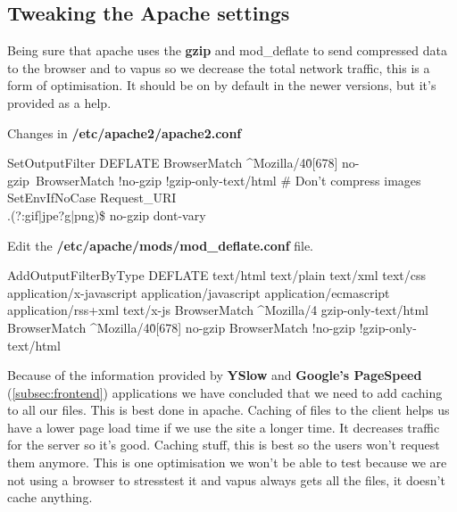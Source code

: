 \clearpage{}
\subsection{Tweaking the Apache settings}
Being sure that \gls{apache} uses the \textbf{gzip} and mod\_deflate to send compressed data to the browser and to \gls{vapus} so we decrease the total network traffic, this is a form of optimisation. It should be on by default in the newer versions, but it's provided as a help.

Changes in \textbf{/etc/apache2/apache2.conf}
\begin{codelisting}
SetOutputFilter DEFLATE
BrowserMatch ^Mozilla/4\.0[678] no-gzip\
BrowserMatch \bMSI[E] !no-gzip !gzip-only-text/html
# Don't compress images
SetEnvIfNoCase Request_URI \\.(?:gif|jpe?g|png)\$ no-gzip dont-vary
\end{codelisting}
Edit the \textbf{/etc/apache/mods/mod\_deflate.conf }file.
\begin{codelisting}
AddOutputFilterByType DEFLATE text/html text/plain text/xml text/css application/x-javascript application/javascript application/ecmascript application/rss+xml text/x-js
BrowserMatch ^Mozilla/4 gzip-only-text/html
BrowserMatch ^Mozilla/4\.0[678] no-gzip
BrowserMatch \bMSIE !no-gzip !gzip-only-text/html
\end{codelisting}
Because of the information provided by \textbf{YSlow} and \textbf{Google's PageSpeed} (\autoref{subsec:frontend}) applications we have concluded that we need to add caching to all our files. This is best done in \gls{apache}. Caching of files to the client helps us have a lower page load time if we use the site a longer time. It decreases traffic for the server so it's good. Caching stuff, this is best so the users won't request them anymore. This is one optimisation we won't be able to test because we are not using a browser to stresstest it and \gls{vapus} always gets all the files, it doesn't cache anything. 

